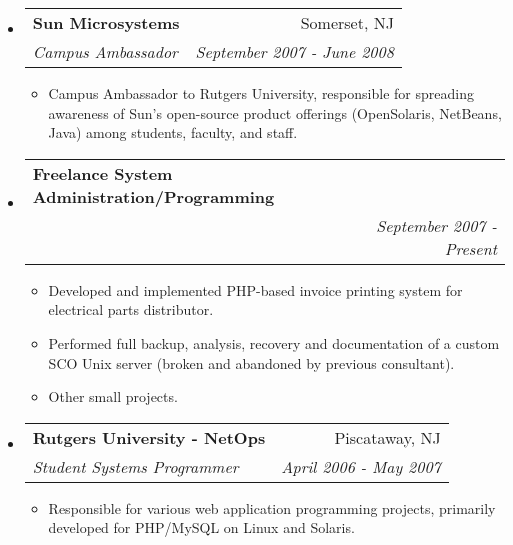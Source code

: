 \documentclass[letterpaper,11pt]{article}
\makeatletter
\newcommand{\resitem}[1]{\item #1 \vspace{-2pt}}
\newcommand{\ressubheading}[4]{
\begin{tabular*}{7.0in}{l@{\extracolsep{\fill}}r}
		\textbf{#1} & #2 \\
		\textit{#3} & \textit{#4} \\
\end{tabular*}\vspace{-6pt}}
\makeatother
\begin{document}
\begin{itemize}
\item
        \ressubheading{Sun Microsystems}{Somerset, NJ}{Campus Ambassador}{September 2007 - June 2008}
        \begin{itemize}
                \resitem{Campus Ambassador to Rutgers University, responsible for spreading awareness of Sun's open-source product offerings (OpenSolaris, NetBeans, Java) among students, faculty, and staff.}
        \end{itemize}

\item
        \ressubheading{Freelance System Administration/Programming}{ }{ }{September 2007 - Present}
        \begin{itemize}
               \resitem{Developed and implemented PHP-based invoice printing system for electrical parts distributor.}
               \resitem{Performed full backup, analysis, recovery and documentation of a custom SCO Unix server (broken and abandoned by previous consultant).}
               \resitem{Other small projects.}
        \end{itemize}

\item
	\ressubheading{Rutgers University - NetOps}{Piscataway, NJ}{Student Systems Programmer}{April 2006 - May 2007}
	\begin{itemize}
		\resitem{Responsible for various web application programming projects, primarily developed for
                  PHP/MySQL on Linux and Solaris.}
	\end{itemize}

\end{itemize}

\pagebreak
\end{document}
